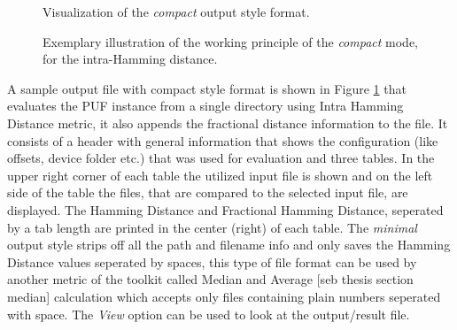 \begin{figure}
\centering
{}
\caption{Visualization of the \emph{compact} output style format.}
\label{img:4_intra_compact}
\end{figure}

\begin{figure}
\centering
{}
\caption{Exemplary illustration of the working principle of the \emph{compact} mode, for the intra-Hamming distance.}
\label{img:4_intra_WP}
\end{figure}

A sample output file with compact style format is shown in Figure \ref{img:4_intra_compact} that evaluates the PUF instance from a single directory using Intra Hamming Distance metric, it also appends the fractional distance information to the file. It consists of a header with general information that shows the configuration (like offsets, device folder etc.) that was used for evaluation and three tables. In the upper right corner of each table the utilized input file is shown and on the left side of the table
the files, that are compared to the selected input file, are displayed. The Hamming Distance and Fractional Hamming Distance, seperated by a tab length are printed in the center (right) of each table. The
\emph{minimal} output style strips off all the path and filename info and only saves the Hamming Distance values seperated by spaces, this type of file format can be used by another metric of the toolkit called Median and Average [seb thesis section median] calculation which accepts only files containing plain numbers seperated with space. The \emph{View} option can be used to look at the output/result file.\\



